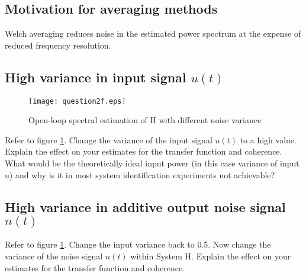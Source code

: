 \documentclass[11pt,a4paper]{article}
\begin{document}
\subsection{Motivation for averaging methods}
Welch averaging reduces noise in the estimated power spectrum at the expense of
reduced frequency resolution.

\subsection{High variance in input signal $u(t)$}
\begin{figure}
    \begin{center}
        \texttt{[image: question2f.eps]}
    \end{center}
    \caption{Open-loop spectral estimation of H with different noise variance}
    \label{fig:2f}
\end{figure}
Refer to figure \ref{fig:2f}.
Change the variance of the input signal $u(t)$ to a high value. Explain the
effect on your estimates for the transfer function and coherence. What would be
the theoretically ideal input power (in this case variance of input u) and why
is it in most system identification experiments not achievable?


\subsection{High variance in additive output noise signal $n(t)$}
Refer to figure \ref{fig:2f}.
Change the input variance back to 0.5. Now change the variance of the noise
signal $n(t)$ within System H. Explain the effect on your estimates for the
transfer function and coherence.
\end{document}
